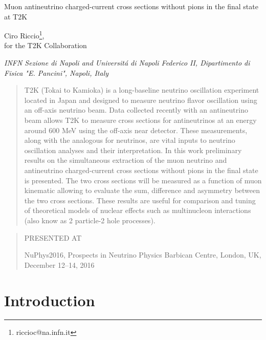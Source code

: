 \documentclass[12pt]{article}
\newcommand\pubnumber{NuPhys2016-Riccio}
\newcommand\pubdate{\today}
\def\napoli{INFN Sezione di Napoli and Universit\'a di Napoli Federico II, Dipartimento di Fisica "E. Pancini",
	 Napoli, Italy}
\def\Title#1{\begin{center} {\Large #1 } \end{center}}
\def\Author#1{\begin{center}{ \sc #1} \end{center}}
\def\Address#1{\begin{center}{ \it #1} \end{center}}
\newcommand\pubblock{\rightline{\begin{tabular}{l} \pubnumber\\
         \pubdate  \end{tabular}}}
\newenvironment{Abstract}{\begin{quotation}  }{\end{quotation}}
\newenvironment{Presented}{\begin{quotation} \begin{center} 
             PRESENTED AT\end{center}\bigskip 
      \begin{center}\begin{large}}{\end{large}\end{center} \end{quotation}}
\begin{document}
\begin{titlepage}
\pubblock

\vfill
\Title{Muon antineutrino charged-current cross sections without pions in the final state at T2K}
\vfill
\Author{Ciro Riccio\footnote{riccioc@na.infn.it}, \\for the T2K Collaboration}
\Address{\napoli}
\vfill


\begin{Abstract}
T2K (Tokai to Kamioka) is a long-baseline neutrino oscillation experiment located in Japan and designed to measure neutrino flavor oscillation using an off-axis neutrino beam. Data collected recently with an antineutrino beam allows T2K to measure cross sections for antineutrinos at an energy around 600 MeV using the off-axis near detector. These measurements, along with the analogous for neutrinos, are vital inputs to neutrino oscillation analyses and their interpretation. In this work preliminary results on the simultaneous extraction of the muon neutrino and antineutrino charged-current cross sections without pions in the final state is presented. The two cross sections will be measured as a function of muon kinematic allowing to evaluate the sum, difference and asymmetry between the two cross sections. These results are useful for comparison and tuning of theoretical models of nuclear effects such as multinucleon interactions (also know as 2 particle-2 hole processes).
\end{Abstract}
\vfill
\begin{Presented}
NuPhys2016, Prospects in Neutrino Physics
Barbican Centre, London, UK,  December 12--14, 2016
\end{Presented}

\vfill
\end{titlepage}
\def\thefootnote{\fnsymbol{footnote}}
\setcounter{footnote}{0}
%

\section{Introduction}
\end{document}
